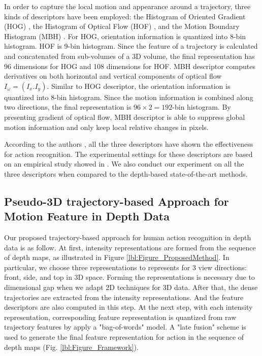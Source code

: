 \documentclass[review]{elsarticle}
\begin{document}
In order to capture the local motion and appearance around a trajectory, three kinds of descriptors have been employed: the Histogram of Oriented Gradient (HOG) \cite{dalal2005histograms}, the Histogram of Optical Flow (HOF) \cite{laptev2008learning}, and the Motion Boundary Histogram (MBH) \cite{dalal2006human}. For HOG, orientation information is quantized into 8-bin histogram. HOF is 9-bin histogram. Since the feature of a trajectory is calculated and concatenated from sub-volumes of a 3D volume, the final representation has 96 dimensions for HOG and 108 dimensions for HOF. MBH descriptor computes derivatives on both horizontal and vertical components of optical flow $I_\omega = (I_x. I_y)$. Similar to HOG descriptor, the orientation information is quantized into 8-bin histogram. Since the motion information is combined along two directions, the final representation is $96 \times 2 = 192$-bin histogram. By presenting gradient of optical flow, MBH descriptor is able to suppress global motion information and only keep local relative changes in pixels.

According to the authors \cite{laptev2008learning, wang2011densetraj, wang2009evaluation, liu2009recognizing}, all the three descriptors have shown the effectiveness for action recognition. The experimental settings for these descriptors are based on an empirical study showed in \cite{wang2011densetraj}. We also conduct our experiment on all the three descriptors when compared to the depth-based state-of-the-art methods.

\subsection{Pseudo-3D trajectory-based Approach for Motion Feature in Depth Data}

Our proposed trajectory-based approach for human action recognition in depth data is as follow. At first, intensity representations are formed from the sequence of depth maps, as illustrated in Figure \ref{lbl:Figure_ProposedMethod}. In particular, we choose three representations to represents for 3 view directions: front, side, and top in 3D space. Forming the representations is necessary due to dimensional gap when we adapt 2D techniques for 3D data. After that, the dense trajectories are extracted from the intensity representations. And the feature descriptors are also computed in this step. At the next step, with each intensity representation, corresponding feature representation is quantized from raw trajectory features by apply a "bag-of-words" model. A "late fusion" scheme is used to generate the final feature representation for action in the sequence of depth maps (Fig. \ref{lbl:Figure_Framework}).
\end{document}

